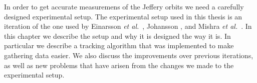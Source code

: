 \noindent In order to get accurate measuremens of the Jeffery orbits we need a carefully designed experimental setup. The experimental setup used in this thesis is an iteration of the one used by Einarsson \emph{et al.}~\cite{JonasExperiment}, Johansson \cite{AntonThesis}, and Mishra \emph{et al.}~\cite{Mishra}. In this chapter we describe the setup and why it is designed the way it is. In particular we describe a tracking algorithm that was implemented to make gathering data easier. We also discuss the improvements over previous iterations, as well as new problems that have arisen from the changes we made to the experimental setup. 
